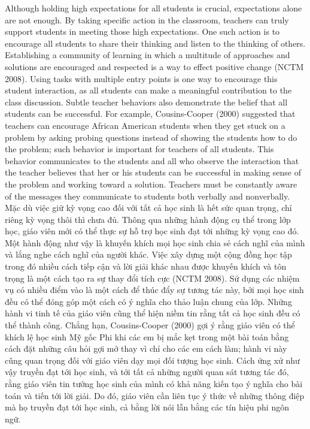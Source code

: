 \documentclass[
  10pt,
  a4paper,
  landscape,
  twoside,
  openany
]{scrbook}
\newcommand{\EN}[1]{#1}
\newcommand{\VI}[1]{#1}
\newcommand{\NOTE}[1]{#1}
\newcounter{example}
\begin{document}
\TriPara
{
\EN{Although holding high expectations for all students is crucial, expectations alone are not enough. By taking specific action in the classroom, teachers can truly support students in meeting those high expectations. One such action is to encourage all students to share their thinking and listen to the thinking of others. Establishing a community of learning in which a multitude of approaches and solutions are encouraged and respected is a way to effect positive change (NCTM 2008). Using tasks with multiple entry points is one way to encourage this student interaction, as all students can make a meaningful contribution to the class discussion. Subtle teacher behaviors also demonstrate the belief that all students can be successful. For example, Cousins-Cooper (2000) suggested that teachers can encourage African American students when they get stuck on a problem by asking probing questions instead of showing the students how to do the problem; such behavior is important for teachers of all students. This behavior communicates to the students and all who observe the interaction that the teacher believes that her or his students can be successful in making sense of the problem and working toward a solution. Teachers must be constantly aware of the messages they communicate to students both verbally and nonverbally.}
}
{
\VI{Mặc dù việc giữ kỳ vọng cao đối với tất cả học sinh là hết sức quan trọng, chỉ riêng kỳ vọng thôi thì chưa đủ. Thông qua những hành động cụ thể trong lớp học, giáo viên mới có thể thực sự hỗ trợ học sinh đạt tới những kỳ vọng cao đó. Một hành động như vậy là khuyến khích mọi học sinh chia sẻ cách nghĩ của mình và lắng nghe cách nghĩ của người khác. Việc xây dựng một cộng đồng học tập trong đó nhiều cách tiếp cận và lời giải khác nhau được khuyến khích và tôn trọng là một cách tạo ra sự thay đổi tích cực (NCTM 2008). Sử dụng các nhiệm vụ có nhiều điểm vào là một cách để thúc đẩy sự tương tác này, bởi mọi học sinh đều có thể đóng góp một cách có ý nghĩa cho thảo luận chung của lớp. Những hành vi tinh tế của giáo viên cũng thể hiện niềm tin rằng tất cả học sinh đều có thể thành công. Chẳng hạn, Cousins-Cooper (2000) gợi ý rằng giáo viên có thể khích lệ học sinh Mỹ gốc Phi khi các em bị mắc kẹt trong một bài toán bằng cách đặt những câu hỏi gợi mở thay vì chỉ cho các em cách làm; hành vi này cũng quan trọng đối với giáo viên dạy mọi đối tượng học sinh. Cách ứng xử như vậy truyền đạt tới học sinh, và tới tất cả những người quan sát tương tác đó, rằng giáo viên tin tưởng học sinh của mình có khả năng kiến tạo ý nghĩa cho bài toán và tiến tới lời giải. Do đó, giáo viên cần liên tục ý thức về những thông điệp mà họ truyền đạt tới học sinh, cả bằng lời nói lẫn bằng các tín hiệu phi ngôn ngữ.}
}
{
\NOTE{}
}
\end{document}
